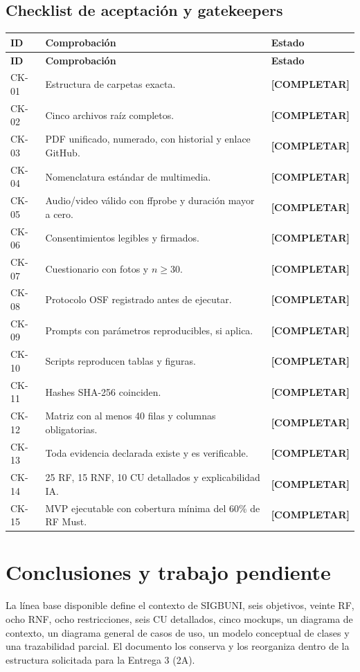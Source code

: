 \documentclass[12pt,journal,onecolumn]{IEEEtran}
\newcommand{\completar}{\textcolor{red!70!black}{\textbf{[COMPLETAR]}}}
\begin{document}
\subsection{Checklist de aceptación y gatekeepers}
\begin{longtable}{P{0.06\textwidth}P{0.78\textwidth}P{0.10\textwidth}}\toprule
\textbf{ID} & \textbf{Comprobación} & \textbf{Estado}\\\midrule\endfirsthead
\toprule\textbf{ID} & \textbf{Comprobación} & \textbf{Estado}\\\midrule\endhead
CK-01 & Estructura de carpetas exacta. & \completar\\
CK-02 & Cinco archivos raíz completos. & \completar\\
CK-03 & PDF unificado, numerado, con historial y enlace GitHub. & \completar\\
CK-04 & Nomenclatura estándar de multimedia. & \completar\\
CK-05 & Audio/video válido con ffprobe y duración mayor a cero. & \completar\\
CK-06 & Consentimientos legibles y firmados. & \completar\\
CK-07 & Cuestionario con fotos y $n\geq30$. & \completar\\
CK-08 & Protocolo OSF registrado antes de ejecutar. & \completar\\
CK-09 & Prompts con parámetros reproducibles, si aplica. & \completar\\
CK-10 & Scripts reproducen tablas y figuras. & \completar\\
CK-11 & Hashes SHA-256 coinciden. & \completar\\
CK-12 & Matriz con al menos 40 filas y columnas obligatorias. & \completar\\
CK-13 & Toda evidencia declarada existe y es verificable. & \completar\\
CK-14 & 25 RF, 15 RNF, 10 CU detallados y explicabilidad IA. & \completar\\
CK-15 & MVP ejecutable con cobertura mínima del 60\% de RF Must. & \completar\\\bottomrule
\end{longtable}

\section{Conclusiones y trabajo pendiente}
La línea base disponible define el contexto de SIGBUNI, seis objetivos, veinte RF, ocho RNF, ocho restricciones, seis CU detallados, cinco mockups, un diagrama de contexto, un diagrama general de casos de uso, un modelo conceptual de clases y una trazabilidad parcial. El documento los conserva y los reorganiza dentro de la estructura solicitada para la Entrega 3 (2A).
\end{document}

